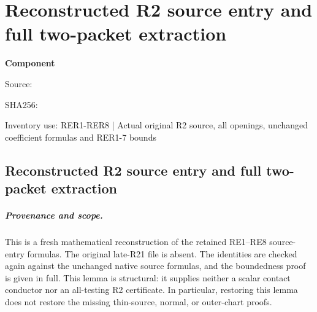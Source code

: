 \chapter{Reconstructed R2 source entry and full two-packet extraction}
\label{component:p667905169990}
\noindent\textbf{Component }\par
{\small\noindent Source: \par}
{\small\noindent SHA256: \par}
{\small\noindent Inventory use: RER1-RER8 | Actual original R2 source, all openings, unchanged coefficient formulas and RER1-7 bounds\par}
\medskip
\section{Reconstructed R2 source entry and full two-packet extraction}
\label{p667905169990:sec:r2-reconstructed-source-entry}

\paragraph{Provenance and scope.}
This is a fresh mathematical reconstruction of the retained RE1--RE8
source-entry formulas.  The original late-R21 file is absent.  The
identities are checked again against the unchanged native source
formulas, and the boundedness proof is given in full.  This lemma is
structural: it supplies neither a scalar contact conductor nor an
all-testing R2 certificate.  In particular, restoring this lemma does
not restore the missing thin-source, normal, or outer-chart proofs.

